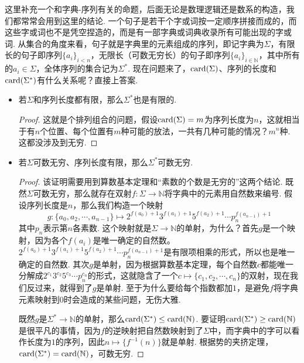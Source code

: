 这里补充一个和字典-序列有关的命题，后面无论是数理逻辑还是数系的构造，我们都常常会用到这里的结论. 一个句子是若干个字或词按一定顺序拼接而成的，而这些字或词也不是凭空捏造的，而是有一部字典或词典收录所有可能出现的字或词. 从集合的角度来看，句子就是字典里的元素组成的序列，即记字典为\(\Sigma\)，有限长的句子即序列\(\{a_i\}_{i < n}\)，无限长（可数无穷长）的句子即序列\(\{a_i\}_{i \in \mathbb{N}}\)，其中所有的\(a_i \in \Sigma\)，全体序列的集合记为\(\Sigma^*\). 现在问题来了，\({\rm card}(\Sigma)\)、序列的长度和\({\rm card}(\Sigma^*)\)有什么关系呢？直接上答案.
\begin{itemize}
    \item 若\(\Sigma\)和序列长度都有限，那么\(\Sigma^*\)也是有限的.
    \begin{proof}
        这就是个排列组合的问题，假设\({\rm card}(\Sigma)=m\)为序列长度为\(n\)，这就相当于有\(n\)个位置、每个位置有\(m\)种可能的放法，一共有几种可能的情况？\(m^n\)种. 这都没涉及到无穷.
    \end{proof}

    \item 若\(\Sigma\)可数无穷、序列长度有限，那么\(\Sigma^*\)可数无穷.
    \begin{proof}

        该证明需要用到算数基本定理和“素数的个数是无穷的”这两个结论. 既然\(\Sigma\)可数无穷，那么就存在双射\(f:\Sigma \to \mathbb{N}\)将字典中的元素用自然数来编号. 假设序列长度是\(n\)，那么我们构造一个映射
        \[g: \{a_0, a_2, \cdots, a_{n-1}\} \mapsto 2^{f(a_0)+1}3^{f(a_1)+1}5^{f(a_2)+1}\cdots p_n^{f(a_{n-1})+1}\]
        其中\(p_n\)表示第\(n\)各素数. 这个映射就是\(\Sigma \to \mathbb{N}\)的单射，为什么？首先\(g\)是一个映射，因为各个\(f(a_i)\)是唯一确定的自然数。\(2^{f(a_0)+1}3^{f(a_1)+1}5^{f(a_2)+1}\cdots p_n^{f(a_{n-1})+1}\)是有限项相乘的形式，所以也是唯一确定的自然数. 其次\(g\)是单射，因为根据算数基本定理，每个自然数\(c\)都能唯一分解成\(2^{c_1}3^{c_2}5^{c_3}\cdots p_n^{c_n}\)的形式，这就隐含了一个\(c \mapsto \{c_1, c_2, \cdots, c_n\}\)的双射，现在我们反过来，就得到了\(g\)是单射. 至于为什么要给每个指数都加\(1\)，是避免\(f\)将字典元素映射到\(0\)时会造成的某些问题，无伤大雅. 

        既然\(g\)是\(\Sigma^* \to \mathbb{N}\)的单射，那么\({\rm card}(\Sigma^*) \leq {\rm card}(\mathbb{N})\). 要证明\({\rm card}(\Sigma^*) \geq {\rm card}(\mathbb{N})\)是很平凡的事情，因为\(f\)的逆映射把自然数映射到了\(\Sigma\)中，而字典中的字可以看作长度为\(1\)的序列，因此\(n \mapsto \{f^{-1}(n)\}\)就是单射. 根据势的夹挤定理，\({\rm card}(\Sigma^*) = {\rm card}(\mathbb{N})\)，可数无穷.
    \end{proof}


\end{itemize}

